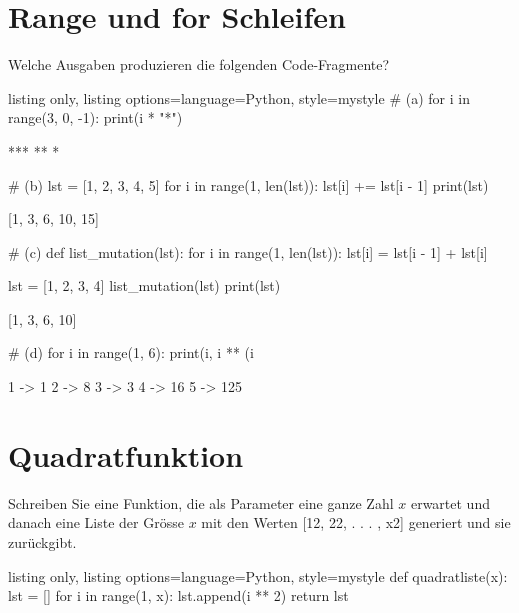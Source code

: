 \documentclass[11pt, oneside]{book}
\begin{document}
\section{Range und for Schleifen}
Welche Ausgaben produzieren die folgenden Code-Fragmente?
\begin{tcblisting}{listing only, listing options={language=Python, style=mystyle}}
# (a)
for i in range(3, 0, -1):
    print(i * "*")

***
**
*

# (b)
lst = [1, 2, 3, 4, 5]
for i in range(1, len(lst)):
    lst[i] += lst[i - 1]
print(lst)

[1, 3, 6, 10, 15]

# (c)
def list_mutation(lst):
    for i in range(1, len(lst)):
        lst[i] = lst[i - 1] + lst[i]

lst = [1, 2, 3, 4]
list_mutation(lst)
print(lst)

[1, 3, 6, 10]

# (d)
for i in range(1, 6):
    print(i, i ** (i %

1 -> 1
2 -> 8
3 -> 3
4 -> 16
5 -> 125
\end{tcblisting}

\newpage
\section{Quadratfunktion}
Schreiben Sie eine Funktion, die als Parameter eine ganze Zahl $x$ erwartet und danach eine Liste der Grösse $x$ mit den Werten [12, 22, . . . , x2] generiert und sie zurückgibt.
\begin{tcblisting}{listing only, listing options={language=Python, style=mystyle}}
def quadratliste(x):
    lst = []
    for i in range(1, x):
        lst.append(i ** 2)
    return lst
\end{tcblisting}
\end{document}
